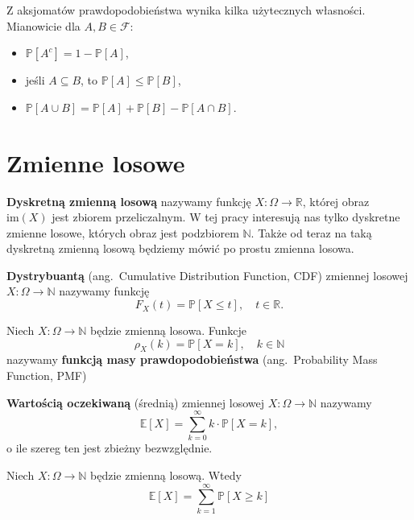 \begin{fact}\label{F:prb}
Z aksjomatów prawdopodobieństwa wynika kilka użytecznych własności. Mianowicie dla $A,B\in\mathcal{F}$:
\begin{itemize}
    \item $\mathbb{P}[A^c] = 1 - \mathbb{P}[A]$,
    \item jeśli $A \subseteq B$, to $\mathbb{P}[A] \leq \mathbb{P}[B]$,
    \item $\mathbb{P}[A \cup B] = \mathbb{P}[A] + \mathbb{P}[B] - \mathbb{P}[A \cap B]$.
\end{itemize}
\end{fact}

\section{Zmienne losowe}

\begin{definition}
\textbf{Dyskretną zmienną losową} nazywamy funkcję $X : \Omega \to \mathbb{R}$, której obraz $\mathrm{im}(X)$ jest zbiorem przeliczalnym. W tej pracy interesują nas tylko dyskretne zmienne losowe, których obraz jest podzbiorem $\mathbb{N}$. Także od teraz na taką dyskretną zmienną losową będziemy mówić po prostu zmienna losowa.  
\end{definition}

\begin{definition}
\textbf{Dystrybuantą} (ang.~Cumulative Distribution Function, CDF) zmiennej losowej $X:\Omega\to\mathbb{N}$ nazywamy funkcję
\[
    F_X(t) = \mathbb{P}[X \leq t], \quad t \in \mathbb{R}.
\]
\end{definition}

\begin{definition}
Niech $X:\Omega\to\mathbb{N}$ będzie zmienną losowa. Funkcje 
\[
    \rho_X(k)=\mathbb{P}[X = k], \quad k \in \mathbb{N}
\]
nazywamy \textbf{funkcją masy prawdopodobieństwa} (ang.~Probability Mass Function, PMF)
\end{definition}

\begin{definition}
\textbf{Wartością oczekiwaną} (średnią) zmiennej losowej $X:\Omega\to\mathbb{N}$ nazywamy
\[
    \mathbb{E}[X] = \sum_{k = 0}^{\infty} k \cdot \mathbb{P}[X = k],
\]
o ile szereg ten jest zbieżny bezwzględnie.
\end{definition}

\begin{fact}\label{F:expected_value_tail_sum}
Niech $X:\Omega\to\mathbb{N}$ będzie zmienną losową. Wtedy 
\[
    \mathbb{E}[X] = \sum_{k=1}^{\infty} \mathbb{P}[X\ge k]
\]
\end{fact}

